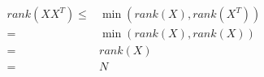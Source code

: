 \documentclass[../main.tex]{subfiles}
\begin{document}
\begin{align*}
    rank(XX^T)
    \leq & \min(rank(X), rank(X^T)) \\
    = & \min(rank(X), rank(X)) \\
    = & rank(X) \\
    = & N
\end{align*}
\end{document}
